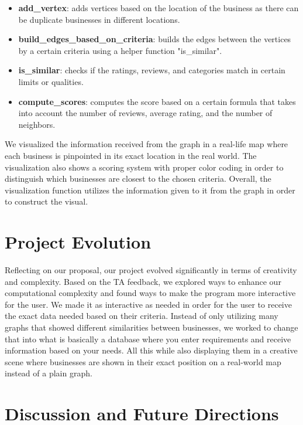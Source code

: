 \documentclass[fontsize=11pt]{article}
\begin{document}
\begin{itemize}
    \item \textbf{add\_vertex}: adds vertices based on the location of the business as there can be duplicate businesses in different locations.
    \item \textbf{build\_edges\_based\_on\_criteria}: builds the edges between the vertices by a certain criteria using a helper function "is\_similar".
    \item \textbf{is\_similar}: checks if the ratings, reviews, and categories match in certain limits or qualities.
    \item \textbf{compute\_scores}: computes the score based on a certain formula that takes into account the number of reviews, average rating, and the number of neighbors.
\end{itemize}

We visualized the information received from the graph in a real-life map where each business is pinpointed in its exact location in the real world. The visualization also shows a scoring system with proper color coding in order to distinguish which businesses are closest to the chosen criteria. Overall, the visualization function utilizes the information given to it from the graph in order to construct the visual.

\section*{Project Evolution}

Reflecting on our proposal, our project evolved significantly in terms of creativity and complexity. Based on the TA feedback, we explored ways to enhance our computational complexity and found ways to make the program more interactive for the user. We made it as interactive as needed in order for the user to receive the exact data needed based on their criteria. Instead of only utilizing many graphs that showed different similarities between businesses, we worked to change that into what is basically a database where you enter requirements and receive information based on your needs. All this while also displaying them in a creative scene where businesses are shown in their exact position on a real-world map instead of a plain graph.

\section*{Discussion and Future Directions}
\end{document}

